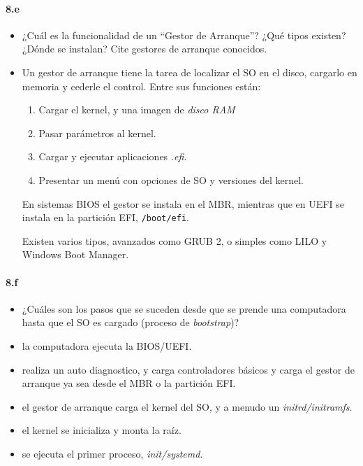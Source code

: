 \documentclass[10pt,a4paper]{paper}
\begin{document}
	\paragraph{8.e}
	\begin{itemize}
		\item ¿Cuál es la funcionalidad de un “Gestor de Arranque”? ¿Qué tipos
		existen?¿Dónde se instalan? Cite gestores de arranque conocidos.
		
		\item Un gestor de arranque tiene la tarea de localizar el SO en el disco,
		cargarlo en memoria y cederle el control. Entre sus funciones están:
		
		\begin{enumerate}
			\item Cargar el kernel, y una imagen de \textit{disco RAM}
			
			\item Pasar parámetros al kernel.
			
			\item Cargar y ejecutar aplicaciones \textit{.efi}.
			
			\item Presentar un menú con opciones de SO y versiones del kernel.
			
			
		\end{enumerate}
		
		En sistemas BIOS el gestor se instala en el MBR, mientras que en UEFI se
		instala en la partición EFI, \texttt{/boot/efi}.
		
		Existen varios tipos, avanzados como GRUB 2, o simples como LILO y Windows Boot
		Manager.
		
	\end{itemize}
	
	
	
	\paragraph{8.f}
	\begin{itemize}
		\item ¿Cuáles son los pasos que se suceden desde que se prende una computadora
		hasta que el SO es cargado (proceso de \textit{bootstrap})?
		
		\item la computadora ejecuta la BIOS/UEFI.
		
		\item realiza un auto diagnostico, y carga controladores básicos y carga el
		gestor de arranque ya sea desde el MBR o la partición EFI.
		
		\item el gestor de arranque carga el kernel del SO, y a menudo un
		\textit{initrd/initramfs}.
		
		\item el kernel se inicializa y monta la raíz.
		
		\item se ejecuta el primer proceso, \textit{init/systemd}.
		
	\end{itemize}
	
\end{document}

